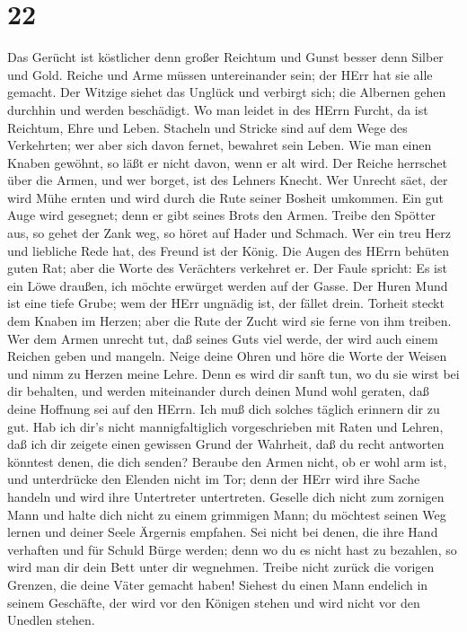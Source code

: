 \hypertarget{section-21}{%
\section{22}\label{section-21}}

 Das Gerücht ist köstlicher denn großer Reichtum und Gunst
besser denn Silber und Gold.  Reiche und Arme müssen
untereinander sein; der HErr hat sie alle gemacht.  Der
Witzige siehet das Unglück und verbirgt sich; die Albernen gehen
durchhin und werden beschädigt.  Wo man leidet in des HErrn
Furcht, da ist Reichtum, Ehre und Leben.  Stacheln und
Stricke sind auf dem Wege des Verkehrten; wer aber sich davon fernet,
bewahret sein Leben.  Wie man einen Knaben gewöhnt, so läßt
er nicht davon, wenn er alt wird.  Der Reiche herrschet über
die Armen, und wer borget, ist des Lehners Knecht.  Wer
Unrecht säet, der wird Mühe ernten und wird durch die Rute seiner
Bosheit umkommen.  Ein gut Auge wird gesegnet; denn er gibt
seines Brots den Armen.  Treibe den Spötter aus, so gehet
der Zank weg, so höret auf Hader und Schmach.  Wer ein treu
Herz und liebliche Rede hat, des Freund ist der König.  Die
Augen des HErrn behüten guten Rat; aber die Worte des Verächters
verkehret er.  Der Faule spricht: Es ist ein Löwe draußen,
ich möchte erwürget werden auf der Gasse.  Der Huren Mund
ist eine tiefe Grube; wem der HErr ungnädig ist, der fället drein.
 Torheit steckt dem Knaben im Herzen; aber die Rute der
Zucht wird sie ferne von ihm treiben.  Wer dem Armen
unrecht tut, daß seines Guts viel werde, der wird auch einem Reichen
geben und mangeln.  Neige deine Ohren und höre die Worte
der Weisen und nimm zu Herzen meine Lehre.  Denn es wird
dir sanft tun, wo du sie wirst bei dir behalten, und werden miteinander
durch deinen Mund wohl geraten,  daß deine Hoffnung sei auf
den HErrn. Ich muß dich solches täglich erinnern dir zu gut.
 Hab ich dir's nicht mannigfaltiglich vorgeschrieben mit
Raten und Lehren,  daß ich dir zeigete einen gewissen Grund
der Wahrheit, daß du recht antworten könntest denen, die dich senden?
 Beraube den Armen nicht, ob er wohl arm ist, und
unterdrücke den Elenden nicht im Tor;  denn der HErr wird
ihre Sache handeln und wird ihre Untertreter untertreten. 
Geselle dich nicht zum zornigen Mann und halte dich nicht zu einem
grimmigen Mann;  du möchtest seinen Weg lernen und deiner
Seele Ärgernis empfahen.  Sei nicht bei denen, die ihre
Hand verhaften und für Schuld Bürge werden;  denn wo du es
nicht hast zu bezahlen, so wird man dir dein Bett unter dir wegnehmen.
 Treibe nicht zurück die vorigen Grenzen, die deine Väter
gemacht haben!  Siehest du einen Mann endelich in seinem
Geschäfte, der wird vor den Königen stehen und wird nicht vor den
Unedlen stehen.

